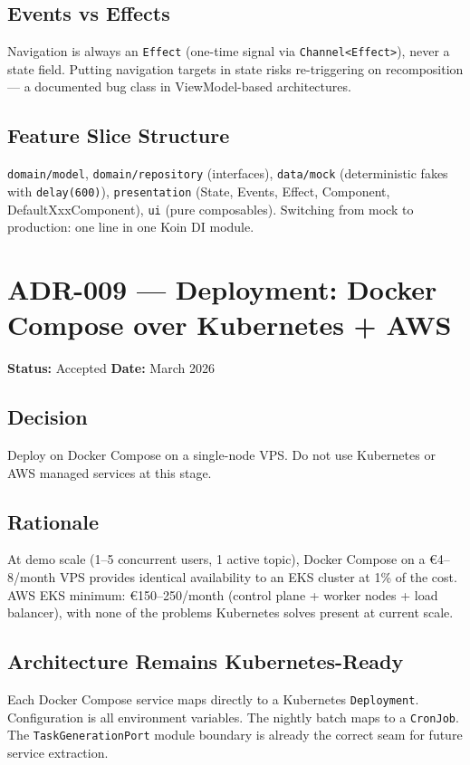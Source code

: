 \subsection*{Events vs Effects}
Navigation is always an \texttt{Effect} (one-time signal via \texttt{Channel<Effect>}), never a state field. Putting navigation targets in state risks re-triggering on recomposition — a documented bug class in ViewModel-based architectures.

\subsection*{Feature Slice Structure}
\texttt{domain/model}, \texttt{domain/repository} (interfaces), \texttt{data/mock} (deterministic fakes with \texttt{delay(600)}), \texttt{presentation} (State, Events, Effect, Component, DefaultXxxComponent), \texttt{ui} (pure composables). Switching from mock to production: one line in one Koin DI module.

\section{ADR-009 — Deployment: Docker Compose over Kubernetes + AWS}
\label{adr:009}
\textbf{Status:} Accepted \quad \textbf{Date:} March 2026

\subsection*{Decision}
Deploy on Docker Compose on a single-node VPS. Do not use Kubernetes or AWS managed services at this stage.

\subsection*{Rationale}
At demo scale (1–5 concurrent users, 1 active topic), Docker Compose on a €4–8/month VPS provides identical availability to an EKS cluster at 1\% of the cost. AWS EKS minimum: €150–250/month (control plane + worker nodes + load balancer), with none of the problems Kubernetes solves present at current scale.

\subsection*{Architecture Remains Kubernetes-Ready}
Each Docker Compose service maps directly to a Kubernetes \texttt{Deployment}. Configuration is all environment variables. The nightly batch maps to a \texttt{CronJob}. The \texttt{TaskGenerationPort} module boundary is already the correct seam for future service extraction.

